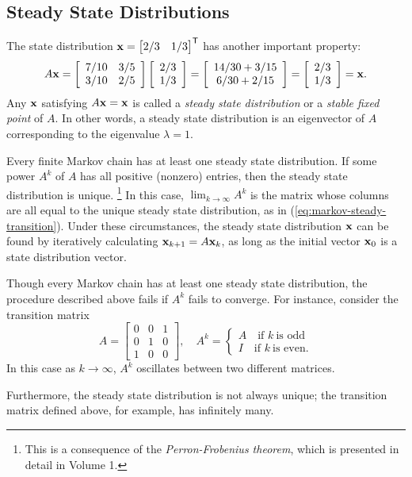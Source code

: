 \subsection*{Steady State Distributions} %

The state distribution $\mathbf{x} = \begin{bmatrix}2/3 & 1/3\end{bmatrix}^{\mathsf T}$ has another important property:
\[
A\mathbf{x} =
\left[\begin{array}{cc}
7/10 & 3/5 \\
3/10 & 2/5 \\
\end{array}\right]
\left[\begin{array}{c}2/3 \\ 1/3\end{array}\right]
=
\left[\begin{array}{c}14/30 + 3/15 \\ 6/30 + 2/15\end{array}\right]
=
\left[\begin{array}{c}2/3 \\ 1/3\end{array}\right]
= \mathbf{x}.
\]
Any $\mathbf{x}$ satisfying $A\mathbf{x} = \mathbf{x}$ is called a \emph{steady state distribution} or a \emph{stable fixed point} of $A$.
In other words, a steady state distribution is an eigenvector of $A$ corresponding to the eigenvalue $\lambda = 1$.

Every finite Markov chain has at least one steady state distribution.
If some power $A^k$ of $A$ has all positive (nonzero) entries, then the steady state distribution is unique.%
\footnote{This is a consequence of the \emph{Perron-Frobenius theorem}, which is presented in detail in Volume 1.}
In this case, $\lim_{k\rightarrow\infty}A^k$ is the matrix whose columns are all equal to the unique steady state distribution, as in (\ref{eq:markov-steady-transition}).
Under these circumstances, the steady state distribution $\mathbf{x}$ can be found by iteratively calculating $\mathbf{x}_{k+1} = A\mathbf{x}_k$, as long as the initial vector $\mathbf{x}_{0}$ is a state distribution vector.

\begin{warn}
Though every Markov chain has at least one steady state distribution, the procedure described above fails if $A^k$ fails to converge.
For instance, consider the transition matrix
\[
A = \left[\begin{array}{ccc}
0 & 0 & 1 \\
0 & 1 & 0 \\
1 & 0 & 0
\end{array}\right]
,\quad A^k = \begin{cases}
A\quad\text{if } k\ \text{is odd}
\\
I\quad\text{if } k\ \text{is even.}
\end{cases}
\]
In this case as $k\rightarrow\infty$, $A^k$ oscillates between two different matrices.

Furthermore, the steady state distribution is not always unique; the transition matrix defined above, for example, has infinitely many.
\end{warn}

